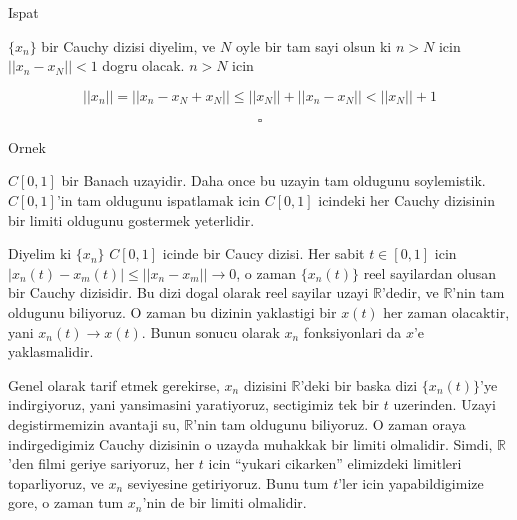 \documentclass[12pt,fleqn]{article}\usepackage{../common}
\begin{document}
Ispat

$\{x_n\}$ bir Cauchy dizisi diyelim, ve $N$ oyle bir tam sayi olsun ki $n >
N$ 
icin $||x_n - x_N|| < 1$ dogru olacak. $n > N$ icin

\[ ||x_n|| = ||x_n - x_N + x_N || \le ||x_N|| + ||x_n - x_N|| < ||x_N|| + 1 \]

\[ \square \]

Ornek

$C[0,1]$ bir Banach uzayidir. Daha once bu uzayin tam oldugunu
soylemistik. $C[0,1]$'in tam oldugunu ispatlamak icin $C[0,1]$ icindeki her
Cauchy dizisinin bir limiti oldugunu gostermek yeterlidir. 

Diyelim ki $\{x_n\}$ $C[0,1]$ icinde bir Caucy dizisi. Her sabit $t \in
[0,1]$ 
icin $|x_n(t) - x_m(t)| \le ||x_n - x_m|| \to 0$, o zaman  $\{x_n(t)\}$
reel sayilardan olusan bir Cauchy dizisidir. Bu dizi dogal olarak reel
sayilar uzayi $\mathbb{R}$'dedir, ve $\mathbb{R}$'nin tam oldugunu
biliyoruz. O zaman bu dizinin yaklastigi bir $x(t)$ her zaman olacaktir,
yani $x_n(t) \to x(t)$. Bunun sonucu olarak $x_n$ fonksiyonlari da $x$'e
yaklasmalidir. 

Genel olarak tarif etmek gerekirse, $x_n$ dizisini $\mathbb{R}$'deki bir
baska dizi $\{x_n(t)\}$'ye indirgiyoruz, yani yansimasini yaratiyoruz,
sectigimiz tek bir $t$ uzerinden. Uzayi degistirmemizin avantaji su,
$\mathbb{R}$'nin tam oldugunu biliyoruz. O zaman oraya indirgedigimiz
Cauchy dizisinin o uzayda muhakkak bir limiti olmalidir. Simdi,
$\mathbb{R}$'den filmi geriye sariyoruz, her $t$ icin ``yukari cikarken''
elimizdeki limitleri toparliyoruz, ve $x_n$ seviyesine getiriyoruz. Bunu
tum $t$'ler icin yapabildigimize gore, o zaman tum $x_n$'nin de bir limiti
olmalidir.
\end{document}
